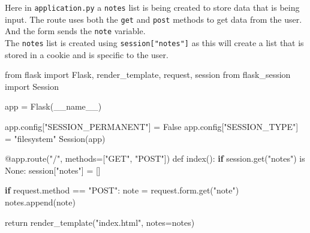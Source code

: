 \documentclass[]{book}
\newenvironment{Shaded}{\begin{snugshade}}{\end{snugshade}}
\newcommand{\KeywordTok}[1]{\textcolor[rgb]{0.13,0.29,0.53}{\textbf{#1}}}
\newcommand{\StringTok}[1]{\textcolor[rgb]{0.31,0.60,0.02}{#1}}
\newcommand{\BuiltInTok}[1]{#1}
\newcommand{\ExtensionTok}[1]{#1}
\newcommand{\NormalTok}[1]{#1}
\begin{document}
Here in \texttt{application.py} a \texttt{notes} list is being created
to store data that is being input. The route uses both the \texttt{get}
and \texttt{post} methods to get data from the user. And the form sends
the \texttt{note} variable.\\
The \texttt{notes} list is created using \texttt{session{[}"notes"{]}}
as this will create a list that is stored in a cookie and is specific to
the user.

\begin{Shaded}
\begin{Highlighting}[]
\ExtensionTok{from}\NormalTok{ flask import Flask, render_template, request, session}
\ExtensionTok{from}\NormalTok{ flask_session import Session                         }
                                                          
\ExtensionTok{app}\NormalTok{ = Flask(__name__)                                     }
                                                          
\ExtensionTok{app.config}\NormalTok{[}\StringTok{"SESSION_PERMANENT"}\NormalTok{] = False                   }
\ExtensionTok{app.config}\NormalTok{[}\StringTok{"SESSION_TYPE"}\NormalTok{] = }\StringTok{"filesystem"}                 
\ExtensionTok{Session}\NormalTok{(app)                                              }
                                                          
\ExtensionTok{@app.route}\NormalTok{(}\StringTok{"/"}\NormalTok{, methods=[}\StringTok{"GET"}\NormalTok{, }\StringTok{"POST"}\NormalTok{])                  }
\ExtensionTok{def}\NormalTok{ index()}\BuiltInTok{:}                                              
    \KeywordTok{if} \ExtensionTok{session.get}\NormalTok{(}\StringTok{"notes"}\NormalTok{) }\ExtensionTok{is}\NormalTok{ None:}
        \ExtensionTok{session}\NormalTok{[}\StringTok{"notes"}\NormalTok{] = []       }

    \KeywordTok{if} \ExtensionTok{request.method}\NormalTok{ == }\StringTok{"POST"}\NormalTok{:                          }
        \ExtensionTok{note}\NormalTok{ = request.form.get(}\StringTok{"note"}\NormalTok{)                   }
        \ExtensionTok{notes.append}\NormalTok{(note)                                }
                                                          
    \BuiltInTok{return}\NormalTok{ render_template(}\StringTok{"index.html"}\NormalTok{, notes=notes)     }
\end{Highlighting}
\end{Shaded}
\end{document}
